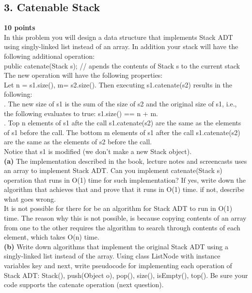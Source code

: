 \documentclass[12pt]{article}
\begin{document}
\subsection*{3. Catenable Stack}
\linebreak
\textbf{10 points} \\
\linebreak
 In this problem you will design a data structure that implements Stack ADT using singly-linked list instead of an array. In addition your stack will have the following additional operation: \\
 \linebreak
 public catenate(Stack s); // apends the contents of Stack s to the current stack \\
 \linebreak
 The new operation will have the following properties: \\
 \linebreak
 Let n = s1.size(), m= s2.size(). Then executing s1.catenate(s2) results in the following: \\
 . The new size of s1 is the sum of the size of s2 and the original size of s1, i.e., the following evaluates to true: s1.size() == n + m. \\
 . Top n elements of s1 afte the call s1.catenate(s2) are the same as the elements of s1 before the call. The bottom m elements of s1 after the call s1.catenate(s2) are the same as the elements of s2 before the call. \\
 Notice that s1 is modified (we don't make a new Stack object). \\
 \linebreak
 \textbf{(a)} The implementation described in the book, lecture notes and screencasts uses an array to implement Stack ADT. Can you implement catenate(Stack s) operation that runs in O(1) time for such implementation? If yes, write down the algorithm that achieves that and prove that it runs in O(1) time. if not, describe what goes wrong. \\
 \linebreak
 It is not possible for there for be an algorithm for Stack ADT to run in O(1) time.  The reason why this is not possible, is because copying contents of an array from one to the other requires the algorithm to search through contents of each element, which takes O(n) time.  \\
 \linebreak
 \textbf{(b)} Write down algorithms that implement the original Stack ADT using a singly-linked list instead of the array.  Using class ListNode with instance variables key and next, write pseudocode for implementing each operation of Stack ADT: Stack(), push(Object o), pop(),  size(), isEmpty(), top(). Be sure your code supports the catenate operation (next question). \\
\end{document}
